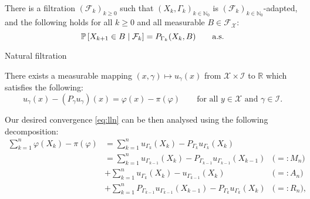 \begin{assumption}
   \label{a:markov}
   There is a filtration $(\mathcal{F}_k)_{k\ge 0}$ such that $(X_k, \Gamma_k)_{k \in \mathbb{N}_0}$ is $(\mathcal{F}_k)_{k \in \mathbb{N}_0}$-adapted, and the following holds for all $k\ge 0$ and all measurable $B \in \mathcal{F}_{\mathcal{X}}$:
   \[
   \mathbb{P} \left[ X_{k+1}\in B\mid \mathcal{F}_k \right] = P_{\Gamma_k}(X_k,B) \qquad \text{a.s.}
   \]
\end{assumption}

Natural filtration

\begin{assumption}
   \label{a:poisson}
There exists a measurable mapping $(x, \gamma) \mapsto u_{\gamma}(x)$ from $\mathcal{X} \times \mathcal{I}$ to $\mathbb{R}$ which satisfies the following:
\begin{equation}
    \label{eq:poisson}
   u_{\gamma}(x) - (P_{\gamma} u_{\gamma})(x) = \varphi(x) - \pi(\varphi) \qquad \text{for all $y \in \mathcal{X}$ and $\gamma \in \mathcal{I}$}.
\end{equation}
\end{assumption}

Our desired convergence \eqref{eq:lln} can be then analysed using the following decomposition:
\begin{align}
   \sum_{k=1}^n {\varphi(X_k) - \pi(\varphi)} 
   &= 
   \sum_{k=1}^n {u_{\Gamma_k}(X_k) - P_{\Gamma_k}u_{\Gamma_k}(X_k)} \label{eq:main-decomposition} \\
   &= 
   \sum_{k=1}^n {u_{\Gamma_{k-1}}(X_k) - P_{\Gamma_{k-1}}u_{\Gamma_{k-1}}(X_{k-1})} 
   & \big(=: M_n\big) 
   \nonumber\\
   & + 
   \sum_{k=1}^n {u_{\Gamma_k}(X_k) - u_{\Gamma_{k-1}}(X_k)} 
   & \big(=: A_n\big) 
   \nonumber\\
   & + 
   \sum_{k=1}^n {P_{\Gamma_{k-1}}u_{\Gamma_{k-1}}(X_{k-1}) - P_{\Gamma_k}u_{\Gamma_k}(X_k)} &\big(=: R_n\big),
   \nonumber
\end{align}



